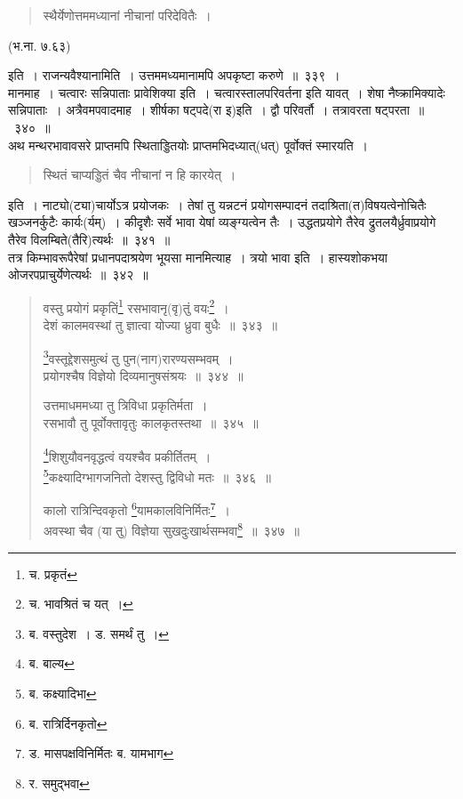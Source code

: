 \documentclass[11pt, openany]{book}
\begin{document}
\begin{quote}
{\qt स्थैर्येणोत्तममध्यानां नीचानां परिदेवितैः~। }
\end{quote}

\begin{center}
 (भ.ना. ७.६३) 
\end{center}

\noindent
इति~। {\qtt राजन्यवैश्यानामिति}~। उत्तममध्यमानामपि अपकृष्टा करुणे~॥~३३९~।\\

मानमाह~। {\qtt चत्वारः सन्निपाताः प्रावेशिक्या} इति~। चत्वारस्तालपरिवर्तना इति यावत्~। शेषा नैष्क्रामिक्यादेः सन्निपाताः~। अत्रैवमपवादमाह~। शीर्षका षट्पदे(रा इ)इति~। द्वौ परिवर्तौ~। तत्रावरता षट्परता~॥~३४०~॥\\

अथ मन्थरभावावसरे प्राप्तमपि स्थिताड्डितयोः प्राप्तमभिदध्यात्(धत्) पूर्वोक्तं स्मारयति~।

\begin{quote}
{\qt स्थितं चाप्यड्डितं चैव नीचानां न हि कारयेत्~।}
\end{quote}

\noindent
इति~। नाट्यो(ट्या)चार्योऽत्र प्रयोजकः~। तेषां तु यन्नटनं प्रयोगसम्पादनं तदाश्रिता(त)विषयत्वेनोचितैः खञ्जनर्कुटैः कार्यः(र्यम्)~। कीदृशैः सर्वे भावा येषां व्यङ्ग्यत्वेन तैः~। उद्धतप्रयोगे तैरेव द्रुतलयैर्ध्रुवाप्रयोगे तैरेव विलम्बिते(तैरि)त्यर्थः~॥~३४१~॥\\

तत्र किम्भावरूपैरेषां प्रधानपदाश्रयेण भूयसा मानमित्याह~। त्रयो भावा इति~। हास्यशोकभया ओजरपप्राचुर्येणेत्यर्थः~॥~३४२~॥ 

\newpage

\begin{quote}
{\na वस्तु प्रयोगं प्रकृतिं\renewcommand{\thefootnote}{1}\footnote{च. प्रकृतं} रसभावानृ(वृ)तुं वयः\renewcommand{\thefootnote}{2}\footnote{च. भावश्रितं च यत्~।}~।\\
 देशं कालमवस्थां तु ज्ञात्वा योज्या ध्रुवा बुधैः~॥~३४३~॥

 \renewcommand{\thefootnote}{3}\footnote{ब. वस्तुदेश~। ड. समर्थं तु~।}वस्तूद्देशसमुत्थं तु पुन(नाग)रारण्यसम्भवम्~।\\
 प्रयोगश्चैष विज्ञेयो दिव्यमानुषसंश्रयः~॥~३४४~॥
 
 उत्तमाधममध्या तु त्रिविधा प्रकृतिर्मता~। \\
 रसभावौ तु पूर्वोक्तावृतुः कालकृतस्तथा~॥~३४५~॥

 \renewcommand{\thefootnote}{4}\footnote{ब. बाल्य}शिशुयौवनवृद्धत्वं वयश्चैव प्रकीर्तितम्~।\\
 \renewcommand{\thefootnote}{5}\footnote{ब. कक्ष्यादिभा\textendash }कक्ष्यादिग्भागजनितो देशस्तु द्विविधो मतः~॥~३४६~॥

 कालो रात्रिन्दिवकृतो \renewcommand{\thefootnote}{6}\footnote{ब. रात्रिर्दिनकृतो}यामकालविनिर्मितः\renewcommand{\thefootnote}{7}\footnote{ड. मासपक्षविनिर्मितः ब. यामभाग}~।\\
 अवस्था चैव (या तु) विज्ञेया सुखदुःखार्थसम्भवा\renewcommand{\thefootnote}{8}\footnote{र. समुद्भवा}~॥~३४७~॥}
\end{quote}
\end{document}
